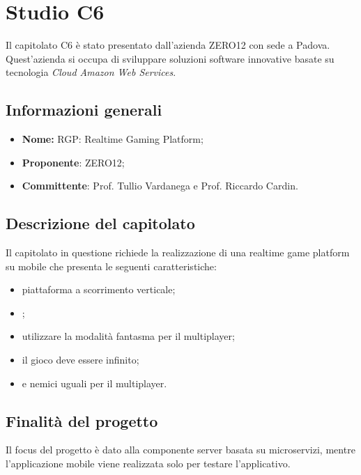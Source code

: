 \section{Studio C6} \label{_c6}
Il capitolato C6 è stato presentato dall'azienda ZERO12 con sede a Padova. Quest'azienda si occupa di sviluppare soluzioni software
innovative basate su tecnologia \textit{Cloud Amazon Web Services}.

\subsection{Informazioni generali}
\begin{itemize}
	\item \textbf{Nome:} RGP: Realtime Gaming Platform;
	\item \textbf{Proponente}: ZERO12;
	\item \textbf{Committente}: Prof. Tullio Vardanega e Prof. Riccardo Cardin.
\end{itemize}

\subsection{Descrizione del capitolato}
Il capitolato in questione richiede la realizzazione di una realtime game platform su mobile che presenta le seguenti caratteristiche:
\begin{itemize}
	\item piattaforma a scorrimento verticale;
	\item {};
	\item utilizzare la modalità fantasma per il multiplayer;
	\item il gioco deve essere infinito;
	\item {} e nemici uguali per il multiplayer.
\end{itemize}


\subsection{Finalità del progetto}
Il focus del progetto è dato alla componente server basata su microservizi, mentre l'applicazione mobile viene realizzata solo per testare l'applicativo.

